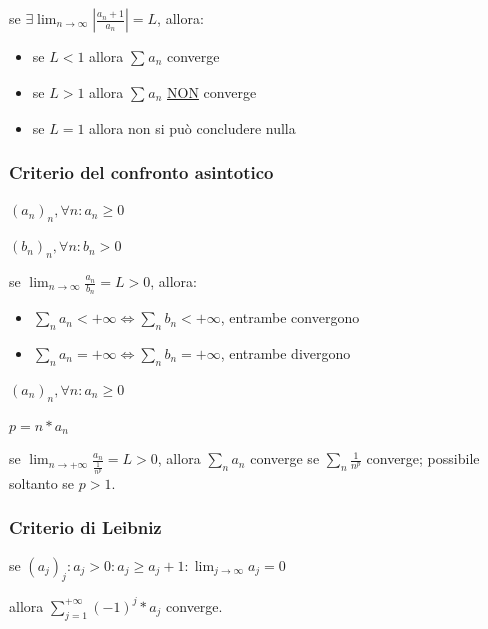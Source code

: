 \documentclass{article}
\begin{document}
\vspace{5mm}
\noindent
se $\exists \lim_{n \to \infty} |\frac{a_n + 1}{a_n}| = L$, allora:

\begin{itemize}
    \item se $L < 1$ allora $\sum_{}^{} a_n$ converge
    \item se $L > 1$ allora $\sum_{}^{} a_n$ \underline{NON} converge
    \item se $L = 1$ allora non si può concludere nulla
\end{itemize}

\subsubsection{Criterio del confronto asintotico}

$(a_n)_n, \forall n : a_n \geq 0$

\noindent
$(b_n)_n, \forall n : b_n > 0$

\vspace{5mm}
\noindent
se $\lim_{n \to \infty} \frac{a_n}{b_n} = L > 0$, allora:

\begin{itemize}
    \item $\sum_{n}^{} a_n < +\infty \Leftrightarrow \sum_{n}^{} b_n < +\infty$, entrambe convergono
    \item $\sum_{n}^{} a_n = +\infty \Leftrightarrow \sum_{n}^{} b_n = +\infty$, entrambe divergono
\end{itemize}

\vspace{5mm}
\noindent
$(a_n)_n, \forall n : a_n \geq 0$

\noindent
$p = n * a_n$

\vspace{5mm}
\noindent
se $\lim_{n \to +\infty} \frac{a_n}{\frac{1}{n^p}} = L > 0$, allora
$\sum_{n}^{} a_n$ converge se $\sum_{n}^{} \frac{1}{n^p}$ converge; possibile soltanto se $p > 1$.

\subsubsection{Criterio di Leibniz}

se $(a_j)_j : a_j > 0 : a_j \geq a_j + 1 : \lim_{j \to \infty} a_j = 0$

\noindent
allora $\sum_{j = 1}^{+\infty} (-1)^j * a_j$ converge.
\end{document}
